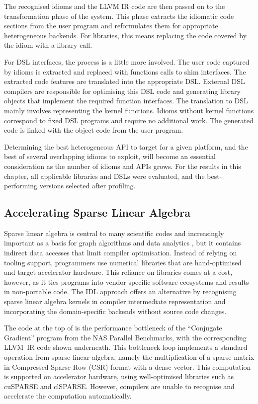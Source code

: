     The recognised idioms and the LLVM IR code are then passed on to the
    transformation phase of the system.
    This phase extracts the idiomatic code sections from the user program and
    reformulates them for appropriate heterogeneous backends.
    For libraries, this means replacing the code covered by the idiom with a
    library call. 

    For DSL interfaces, the process is a little more involved.
    The user code captured by idioms is extracted and replaced with functions
    calls to shim interfaces.
    The extracted code features are translated into the appropriate DSL.
    External DSL compilers are responsible for optimising this DSL code and
    generating library objects that implement the required function interfaces.
    The translation to DSL mainly involves representing the kernel functions.
    Idioms without kernel functions correspond to fixed DSL programs and
    require no additional work.
    The generated code is linked with the object code from the user program.

    Determining the best heterogeneous API to target for a given platform, and
    the best of several overlapping idioms to exploit, will become an essential
    consideration as the number of idioms and APIs grows.
    For the results in this chapter, all applicable libraries and DSLs were
    evaluated, and the best-performing versions selected after profiling.

\subsection{Accelerating Sparse Linear Algebra}

    Sparse linear algebra is central to many scientific codes and increasingly
    important as a basis for graph algorithms and data analytics
    \cite{Kepner2015GraphsMA}, but it contains indirect data accesses that
    limit compiler optimisation.
    Instead of relying on tooling support, programmers use numerical libraries
    that are hand-optimised and target accelerator hardware.
    This reliance on libraries comes at a cost, however, as it ties programs
    into vendor-specific software ecosystems and results in non-portable code.
    The IDL approach offers an alternative by recognising sparse linear algebra
    kernels in compiler intermediate representation and incorporating the
    domain-specific backends without source code changes.

    The code at the top of  is the performance
    bottleneck of the ``Conjugate Gradient'' program from the NAS
    Parallel Benchmarks, with the corresponding LLVM~IR code shown underneath.
    This bottleneck loop implements a standard operation from sparse linear
    algebra, namely the multiplication of a sparse matrix in
    Compressed Sparse Row (CSR) format with a dense vector.
    This computation is supported on accelerator hardware, using well-optimised
    libraries such as cuSPARSE and clSPARSE.
    However, compilers are unable to recognise and accelerate the computation
    automatically.

